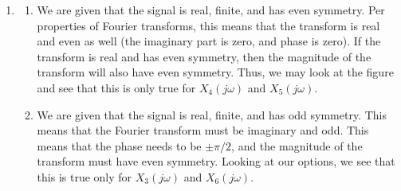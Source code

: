 \begin{enumerate}
\begin{enumerate}
    \end{enumerate}

  \item

    \begin{enumerate}

      \item We are given that the signal is real, finite, and has even symmetry. Per properties of Fourier transforms, this means that the transform is real and even as well (the imaginary part is zero, and phase is zero). If the transform is real and has even symmetry, then the magnitude of the transform will also have even symmetry. Thus, we may look at the figure and see that this is only true for $X_4(j\omega)$ and $X_5(j\omega)$.

      \item We are given that the signal is real, finite, and has odd symmetry. This means that the Fourier transform must be imaginary and odd. This means that the phase needs to be $\pm\pi/2$, and the magnitude of the transform must have even symmetry. Looking at our options, we see that this is true only for $X_3(j\omega)$ and $X_6(j\omega)$.

    \end{enumerate}

\end{enumerate}



